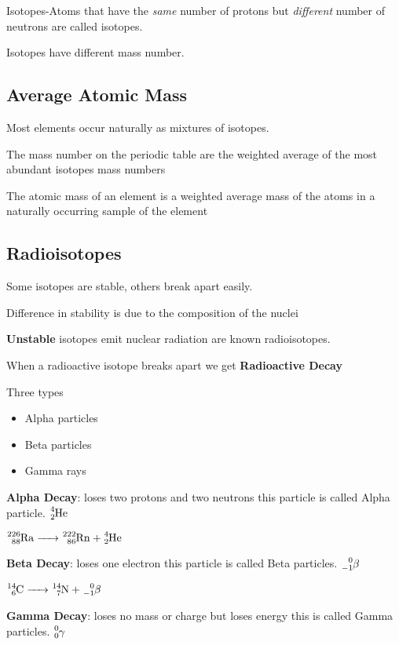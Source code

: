 \documentclass[12pt]{article}
\begin{document}
Isotopes-Atoms that have the \emph{same} number of protons but \emph{different} number of neutrons are called isotopes.

Isotopes have different mass number.

\subsection{Average Atomic Mass}

Most elements occur naturally as mixtures of isotopes.

The mass number on the periodic table are the weighted average of the most abundant isotopes mass numbers

The atomic mass of an element is a weighted average mass of the atoms in a naturally occurring sample of the element


\subsection{Radioisotopes}
Some isotopes are stable, others break apart easily.

Difference in stability is due to the composition of the nuclei

\textbf{Unstable} isotopes emit nuclear radiation are known radioisotopes.

When a radioactive isotope breaks apart we get \textbf{Radioactive Decay}

Three types

\begin{itemize}
    \item Alpha particles
    \item Beta particles
    \item Gamma rays
\end{itemize}


\textbf{Alpha Decay}: loses two protons and two neutrons this particle is called Alpha particle. $\ce{^4_2He}$

$\ce{^{226}_{88}Ra -> ^{222}_{86}Rn + ^4_2He}$

\textbf{Beta Decay}: loses one electron this particle is called Beta particles. $\ce{^0_{-1}\beta}$

$\ce{^{14}_6C -> ^{14}_7N + ^0_{-1}\beta}$

\textbf{Gamma Decay}: loses no mass or charge but loses energy this is called Gamma particles. $\ce{^0_0\gamma}$
\end{document}
